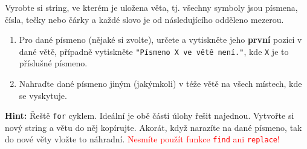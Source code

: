\question[70]
Vyrobte si string, ve kterém je uložena věta, tj. všechny symboly jsou písmena,
čísla, tečky nebo čárky a každé slovo je od následujícího odděleno mezerou.
\begin{enumerate}[label=(\alph*)]
	\item Pro dané písmeno (nějaké si zvolte), určete a vytiskněte jeho
	\textbf{první} pozici v dané větě, případně vytiskněte \texttt{"Písmeno X ve
	větě není."}, kde \texttt{X} je to příslušné písmeno.
	\item Nahraďte dané písmeno jiným (jakýmkoli) v téže větě na všech místech,
	kde se vyskytuje.
\end{enumerate}
\textbf{Hint:} Řeště \texttt{for} cyklem. Ideální je obě části úlohy řešit najednou.
Vytvořte si nový string a větu do něj kopírujte. Akorát, když narazíte na dané
písmeno, tak do nové věty vložte to náhradní.
\textcolor{red}{Nesmíte použít funkce \texttt{find} ani \texttt{replace}!}